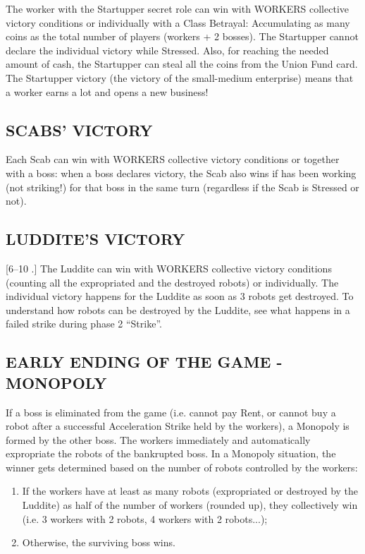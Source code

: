         The worker with the Startupper secret role can win with WORKERS collective victory
        conditions or individually with a Class Betrayal: Accumulating as many
        coins as the total number of players (workers + 2 bosses). The Startupper cannot declare
        the individual victory while Stressed. Also, for reaching the needed
        amount of cash, the Startupper can steal all the coins from the Union Fund card.
        The Startupper victory (the victory of the small-medium enterprise) means that a
        worker earns a lot and opens a new business!
    
    \subsection{SCABS' VICTORY}
    
        Each Scab can win with WORKERS collective victory conditions or together with
        a boss: when a boss declares victory, the Scab also wins if has been working (not
        striking!) for that boss in the same turn (regardless if the Scab is Stressed or not).
    
    \subsection{LUDDITE'S VICTORY}
    
        [6–10 \faPeopleGroup.] The Luddite can win with WORKERS collective victory conditions
        (counting all the expropriated and the destroyed robots) or individually. The
        individual victory happens for the Luddite as soon as 3 robots get destroyed. To
        understand how robots can be destroyed by the Luddite, see what happens in a
        failed strike during phase 2 “Strike”.
    
    \subsection{EARLY ENDING OF THE GAME - MONOPOLY}

        If a boss is eliminated from the game (i.e. cannot pay Rent, or cannot buy a
        robot after a successful Acceleration Strike held by the workers), a Monopoly is
        formed by the other boss. The workers immediately and automatically expropriate
        the robots of the bankrupted boss.
        In a Monopoly situation, the winner gets determined based on the number of
        robots controlled by the workers:

        \begin{enumerate}
            \item If the workers have at least as many robots (expropriated or destroyed by the
            Luddite) as half of the number of workers (rounded up), they collectively win
            (i.e. 3 workers with 2 robots, 4 workers with 2 robots...);
            \item Otherwise, the surviving boss wins.
        \end{enumerate}

